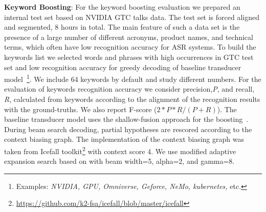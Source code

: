 \documentclass{article}
\begin{document}
\textbf{Keyword Boosting}: 
For the keyword boosting evaluation we prepared an internal test set based on NVIDIA GTC talks data. 
The test set is forced aligned and segmented,  8 hours in total.
The main feature of such a data set is the presence of a large number of different acronyms, product names, and technical terms, which often have low recognition accuracy for ASR systems.
%
To build the keywords list we selected words and phrases with high occurrences in  GTC test set and low recognition accuracy for greedy decoding of baseline transducer model~\footnote{Examples: {\em NVIDIA, GPU, Omniverse, Geforce, NeMo, kubernetes,} etc.}. We include 64 keywords by default and study different numbers. For the evaluation of keywords recognition accuracy we consider precision,{\em P}, and recall, {\em R}, calculated from keywords  according to the alignment of the recognition results with the ground-truths. We also report F-score ($2*P*R/(P+R)$).
%
The baseline transducer model uses the shallow-fusion approach for the  boosting~\cite{williams2018contextual}. During beam search decoding, partial hypotheses are rescored according to the context biasing graph.
The implementation of the context biasing graph  was taken from Icefall 
toolkit\footnote{\scriptsize\url{https://github.com/k2-fsa/icefall/blob/master/icefall}} with context score 4. %
We use modified adaptive expansion search based on \cite{Kim2020AcceleratingRT} with beam width=5, alpha=2, and gamma=8.
\end{document}
